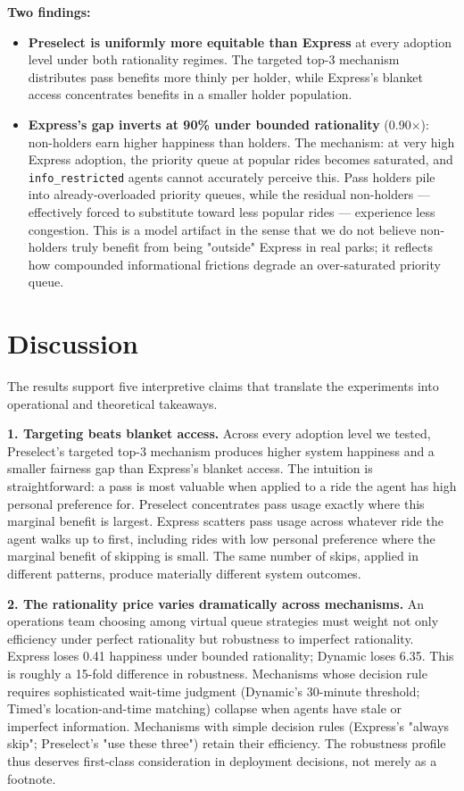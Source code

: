 \documentclass[11pt]{article}
\begin{document}
\textbf{Two findings:}
\begin{itemize}[nosep]
    \item \textbf{Preselect is uniformly more equitable than Express} at every adoption level under both rationality regimes. The targeted top-3 mechanism distributes pass benefits more thinly per holder, while Express's blanket access concentrates benefits in a smaller holder population.
    \item \textbf{Express's gap inverts at 90\% under bounded rationality} (0.90$\times$): non-holders earn higher happiness than holders. The mechanism: at very high Express adoption, the priority queue at popular rides becomes saturated, and \texttt{info\_restricted} agents cannot accurately perceive this. Pass holders pile into already-overloaded priority queues, while the residual non-holders --- effectively forced to substitute toward less popular rides --- experience less congestion. This is a model artifact in the sense that we do not believe non-holders truly benefit from being "outside" Express in real parks; it reflects how compounded informational frictions degrade an over-saturated priority queue.
\end{itemize}

\section{Discussion}

The results support five interpretive claims that translate the experiments into operational and theoretical takeaways.

\textbf{1. Targeting beats blanket access.} Across every adoption level we tested, Preselect's targeted top-3 mechanism produces higher system happiness and a smaller fairness gap than Express's blanket access. The intuition is straightforward: a pass is most valuable when applied to a ride the agent has high personal preference for. Preselect concentrates pass usage exactly where this marginal benefit is largest. Express scatters pass usage across whatever ride the agent walks up to first, including rides with low personal preference where the marginal benefit of skipping is small. The same number of skips, applied in different patterns, produce materially different system outcomes.

\textbf{2. The rationality price varies dramatically across mechanisms.} An operations team choosing among virtual queue strategies must weight not only efficiency under perfect rationality but robustness to imperfect rationality. Express loses 0.41 happiness under bounded rationality; Dynamic loses 6.35. This is roughly a 15-fold difference in robustness. Mechanisms whose decision rule requires sophisticated wait-time judgment (Dynamic's 30-minute threshold; Timed's location-and-time matching) collapse when agents have stale or imperfect information. Mechanisms with simple decision rules (Express's "always skip"; Preselect's "use these three") retain their efficiency. The robustness profile thus deserves first-class consideration in deployment decisions, not merely as a footnote.
\end{document}
